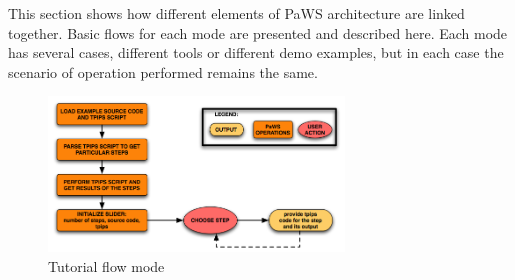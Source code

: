 This section shows how different elements of PaWS architecture are linked together. Basic flows for each mode are presented and described here. Each mode has several cases, different tools or different demo examples, but in each case the scenario of operation performed remains the same.

\begin{figure}[h!]
  \centering
  \includegraphics[width=0.7\textwidth]{reportCh2/tutorial_flow}
  \caption{Tutorial flow mode}
  \label{fig:tutorial_flow}
\end{figure}

